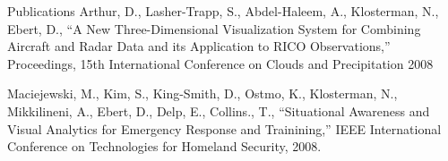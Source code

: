 \begin{category}{Publications}
\citemnobullet Arthur, D., Lasher-Trapp, S., Abdel-Haleem, A., Klosterman, N., Ebert, D., ``A New Three-Dimensional Visualization System for Combining Aircraft and Radar Data and its Application to RICO Observations,'' Proceedings, 15th International Conference on Clouds and Precipitation 2008

\citemnobullet Maciejewski, M., Kim, S., King-Smith, D., Ostmo, K., Klosterman, N., Mikkilineni, A., Ebert, D., Delp, E., Collins., T., ``Situational Awareness and Visual Analytics for Emergency Response and Trainining,'' IEEE International Conference on Technologies for Homeland Security, 2008.
\end{category}
